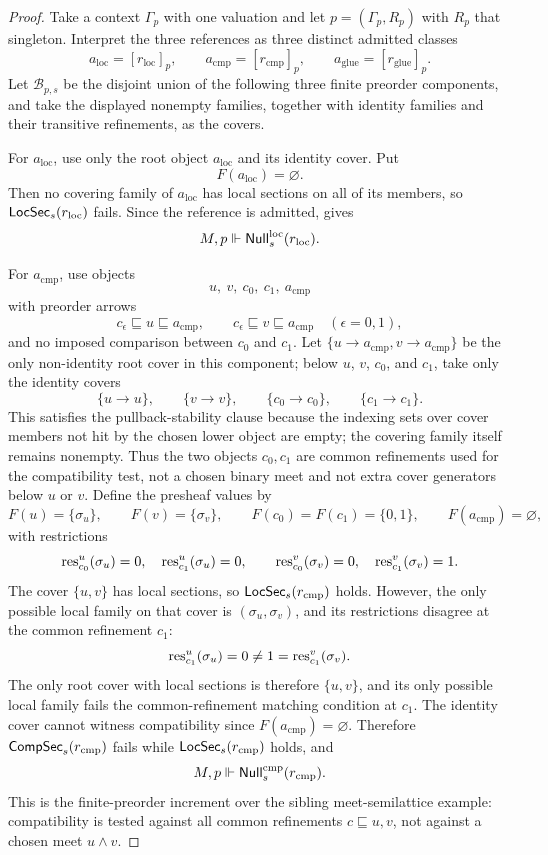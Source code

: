 \begin{proof}
Take a context $\Gamma_p$ with one valuation and let
$p=(\Gamma_p,R_p)$ with $R_p$ that singleton. Interpret the three references as
three distinct admitted classes
\[
a_{\mathrm{loc}}=[r_{\mathrm{loc}}]_p,\qquad
a_{\mathrm{cmp}}=[r_{\mathrm{cmp}}]_p,\qquad
a_{\mathrm{glue}}=[r_{\mathrm{glue}}]_p.
\]
Let $\mathcal B_{p,s}$ be the disjoint union of the following three finite
preorder components, and take the displayed nonempty families, together with
identity families and their transitive refinements, as the covers.

For $a_{\mathrm{loc}}$, use only the root object $a_{\mathrm{loc}}$ and its
identity cover. Put
\[
F(a_{\mathrm{loc}})=\varnothing .
\]
Then no covering family of $a_{\mathrm{loc}}$ has local sections on all of its
members, so $\mathsf{LocSec}_s(r_{\mathrm{loc}})$ fails. Since the reference is
admitted,  gives
\[
M,p\Vdash \mathsf{Null}^{\mathrm{loc}}_s(r_{\mathrm{loc}}).
\]

For $a_{\mathrm{cmp}}$, use objects
\[
u,\ v,\ c_0,\ c_1,\ a_{\mathrm{cmp}}
\]
with preorder arrows
\[
c_\epsilon\sqsubseteq u\sqsubseteq a_{\mathrm{cmp}},
\qquad
c_\epsilon\sqsubseteq v\sqsubseteq a_{\mathrm{cmp}}
\quad(\epsilon=0,1),
\]
and no imposed comparison between $c_0$ and $c_1$. Let
$\{u\to a_{\mathrm{cmp}},v\to a_{\mathrm{cmp}}\}$ be the only non-identity
root cover in this component; below $u$, $v$, $c_0$, and $c_1$, take only the
identity covers
\[
\{u\to u\},\qquad \{v\to v\},\qquad \{c_0\to c_0\},\qquad \{c_1\to c_1\}.
\]
This satisfies the pullback-stability clause because
the indexing sets over cover members not hit by the chosen lower object are
empty; the covering family itself remains nonempty. Thus the two objects
$c_0,c_1$ are common refinements used for the compatibility test, not a chosen
binary meet and not extra cover generators below $u$ or $v$.
Define the presheaf values by
\[
F(u)=\{\sigma_u\},\qquad
F(v)=\{\sigma_v\},\qquad
F(c_0)=F(c_1)=\{0,1\},\qquad
F(a_{\mathrm{cmp}})=\varnothing ,
\]
with restrictions
\[
\mathrm{res}_{c_0}^{u}(\sigma_u)=0,\quad
\mathrm{res}_{c_1}^{u}(\sigma_u)=0,\qquad
\mathrm{res}_{c_0}^{v}(\sigma_v)=0,\quad
\mathrm{res}_{c_1}^{v}(\sigma_v)=1 .
\]
The cover $\{u,v\}$ has local sections, so $\mathsf{LocSec}_s(r_{\mathrm{cmp}})$ holds.
However, the only possible local family on that cover is
$(\sigma_u,\sigma_v)$, and its restrictions disagree at the common refinement
$c_1$:
\[
\mathrm{res}_{c_1}^{u}(\sigma_u)=0\ne 1=\mathrm{res}_{c_1}^{v}(\sigma_v).
\]
The only root cover with local sections is therefore $\{u,v\}$, and its only
possible local family fails the common-refinement matching condition at $c_1$.
The identity cover cannot witness compatibility since
$F(a_{\mathrm{cmp}})=\varnothing$. Therefore $\mathsf{CompSec}_s(r_{\mathrm{cmp}})$
fails while $\mathsf{LocSec}_s(r_{\mathrm{cmp}})$ holds, and
\[
M,p\Vdash \mathsf{Null}^{\mathrm{cmp}}_s(r_{\mathrm{cmp}}).
\]
This is the finite-preorder increment over the sibling meet-semilattice
example: compatibility is tested against all common refinements
$c\sqsubseteq u,v$, not against a chosen meet $u\wedge v$.


\end{proof}
